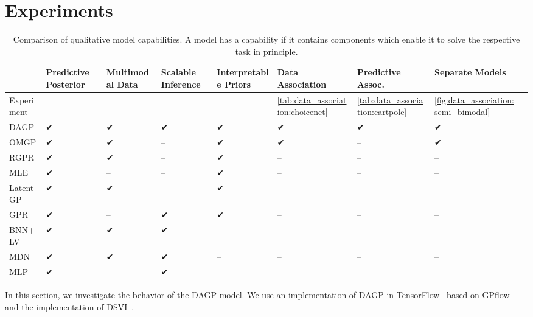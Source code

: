 \section{Experiments}
\label{toc:data_association:experiments}
\begin{table}[t]
    \centering
    \caption{
        \label{tab:data_association:model_capabilities}
        Comparison of qualitative model capabilities.
        A model has a capability if it contains components which enable it to solve the respective task in principle.
    }
    \scriptsize
    \newcommand{\yes}{✔}
    \newcommand{\no}{--}
    \newcommand{\resultrow}[9]{#1 & #4 & #7 & #3 & #9 & #5 & #6 & #8 \\}
    \begin{tabularx}{\linewidth}{lYYYYYYYY}
        \toprule
        \resultrow{}{Bayesian}{Scalable Inference}{Predictive Posterior}{Data Association}{Predictive Assoc.}{Multimodal Data}{Separate Models}{Interpretable Priors}
        \midrule
        Experiment &  &  &  &  & \cref{tab:data_association:choicenet} & \cref{tab:data_association:cartpole} & \cref{fig:data_association:semi_bimodal} \\
        \midrule
        \resultrow{DAGP}{\yes}{\yes}{\yes}{\yes}{\yes}{\yes}{\yes}{\yes}
        \addlinespace
        \resultrow{OMGP \parencite{lazaro-gredilla_overlapping_2012}}{\yes}{\no}{\yes}{\yes}{\no}{\yes}{\yes}{\yes}
        \resultrow{RGPR \parencite{rasmussen_infinite_2002}}{\yes}{\no}{\yes}{\no}{\no}{\yes}{\no}{\yes}
        \resultrow{MLE \parencite{tresp_mixtures_2001}}{\yes}{\no}{\yes}{\no}{\no}{\no}{\no}{\yes}
        \resultrow{LatentGP \parencite{bodin_latent_2017}}{\yes}{\no}{\yes}{\no}{\no}{\yes}{\no}{\yes}
        \resultrow{GPR \parencite{rasmussen_gaussian_2006}}{\yes}{\yes}{\yes}{\no}{\no}{\no}{\no}{\yes}
        \addlinespace
        \resultrow{BNN+LV \parencite{depeweg_learning_2016}}{\yes}{\yes}{\yes}{\no}{\no}{\yes}{\no}{\no}
        \resultrow{MDN \parencite{bishop_mixture_1994}}{\no}{\yes}{\yes}{\no}{\no}{\yes}{\no}{\no}
        \resultrow{MLP}{\no}{\yes}{\yes}{\no}{\no}{\no}{\no}{\no}
        \bottomrule
    \end{tabularx}
\end{table}
In this section, we investigate the behavior of the DAGP model.
We use an implementation of DAGP in TensorFlow~\parencite{abadi_tensorflow_2015} based on GPflow~\parencite{matthews_gpflow_2017} and the implementation of DSVI~\parencite{salimbeni_doubly_2017}.
